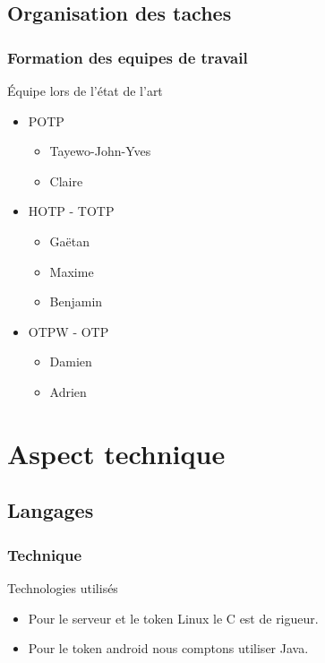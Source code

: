 \documentclass[xcolor=table]{beamer}
\begin{document}
\subsection{Organisation des taches}
\begin{frame}
\frametitle{Formation des equipes de travail}
\begin{block}{Équipe lors de l'état de l'art}
  \begin{itemize}
    \item POTP
    \begin{itemize}
      \item Tayewo-John-Yves 
      \item Claire 
    \end{itemize}
    \item HOTP - TOTP
    \begin{itemize}
      \item Gaëtan 
      \item Maxime 
      \item Benjamin 
    \end{itemize}
    \item OTPW - OTP
    \begin{itemize}
      \item Damien 
      \item Adrien 
    \end{itemize}
  \end{itemize}
\end{block}
\end{frame}



\section{Aspect technique}

\subsection{Langages}
\begin{frame}
\frametitle{Technique}
\begin{block}{Technologies utilisés}
\begin{itemize}
  \item Pour le serveur et le token Linux le C est de rigueur.
  \item Pour le token android nous comptons utiliser Java. 
\end{itemize}
\end{block}
\end{frame}
\end{document}
